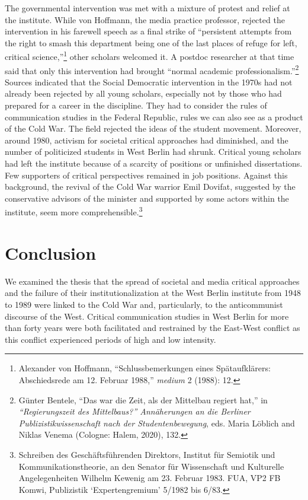 \documentclass{tufte-handout}
\begin{document}
\newpage

The governmental intervention was met with a mixture of protest and
relief at the institute. While von Hoffmann, the media practice
professor, rejected the intervention in his farewell speech as a final
strike of ``persistent attempts from the right to smash this department
being one of the last places of refuge for left, critical
science,''\footnote{Alexander von Hoffmann, ``Schlussbemerkungen eines
  Spätaufklärers: Abschiedsrede am 12. Februar 1988,'' \emph{medium} 2
  (1988): 12.} other scholars welcomed it. A postdoc researcher at that
time said that only this intervention had brought ``normal academic
professionalism.''\footnote{Günter Bentele, ``Das war die Zeit, als der
  Mittelbau regiert hat,'' in \emph{``Regierungszeit des Mittelbaus?''
  Annäherungen an die Berliner Publizistikwissenschaft nach der
  Studentenbewegung}, eds. Maria Löblich and Niklas Venema (Cologne:
  Halem, 2020), 132.} Sources indicated that the Social Democratic
intervention in the 1970s had not already been rejected by all young
scholars, especially not by those who had prepared for a career in the
discipline. They had to consider the rules of communication studies in
the Federal Republic, rules we can also see as a product of the Cold
War. The field rejected the ideas of the student movement. Moreover,
around 1980, activism for societal critical approaches had diminished,
and the number of politicized students in West Berlin had shrunk.
Critical young scholars had left the institute because of a scarcity of
positions or unfinished dissertations. Few supporters of critical
perspectives remained in job positions. Against this background, the
revival of the Cold War warrior Emil Dovifat, suggested by the
conservative advisors of the minister and supported by some actors
within the institute, seem more comprehensible.\footnote{Schreiben des
  Geschäftsführenden Direktors, Institut für Semiotik und
  Kommunikationstheorie, an den Senator für Wissenschaft und Kulturelle
  Angelegenheiten Wilhelm Kewenig am 23. Februar 1983. FUA, VP2 FB
  Komwi, Publizistik `Expertengremium' 5/1982 bis 6/83.}

\hypertarget{conclusion}{%
\section{Conclusion}\label{conclusion}}

We examined the thesis that the spread of societal and media critical
approaches and the failure of their institutionalization at the West
Berlin institute from 1948 to 1989 were linked to the Cold War and,
particularly, to the anticommunist discourse of the West. Critical
communication studies in West Berlin for more than forty years were both
facilitated and restrained by the East-West conflict as this conflict
experienced periods of high and low intensity.
\end{document}

